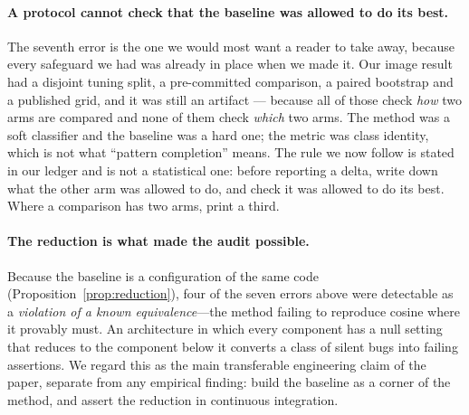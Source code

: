 \paragraph{A protocol cannot check that the baseline was allowed to do its best.} The
seventh error is the one we would most want a reader to take away, because every safeguard
we had was already in place when we made it. Our image result had a disjoint tuning split,
a pre-committed comparison, a paired bootstrap and a published grid, and it was still an
artifact --- because all of those check \emph{how} two arms are compared and none of them
check \emph{which} two arms. The method was a soft classifier and the baseline was a hard
one; the metric was class identity, which is not what ``pattern completion'' means. The
rule we now follow is stated in our ledger and is not a statistical one: before reporting a
delta, write down what the other arm was allowed to do, and check it was allowed to do its
best. Where a comparison has two arms, print a third.

\paragraph{The reduction is what made the audit possible.} Because the baseline is a
configuration of the same code (Proposition~\ref{prop:reduction}), four of the seven errors
above were detectable as a \emph{violation of a known equivalence}---the method failing to
reproduce cosine where it provably must. An architecture in which every component has a null
setting that reduces to the component below it converts a class of silent bugs into failing
assertions. We regard this as the main transferable engineering claim of the paper, separate
from any empirical finding: build the baseline as a corner of the method, and assert the
reduction in continuous integration.
